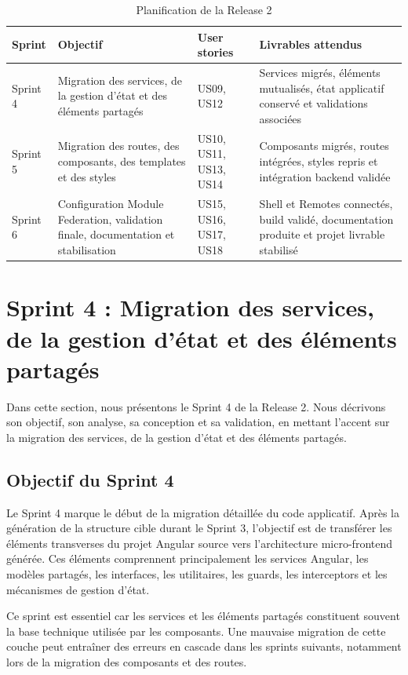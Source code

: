 \begingroup
\renewcommand{\arraystretch}{1.12}
\setlength{\tabcolsep}{4pt}
\begin{longtable}{|p{1.8cm}|p{3.8cm}|p{2.7cm}|p{4.25cm}|}
\caption{Planification de la Release 2}\label{tab:planning-release2}\\
\hline
\textbf{Sprint} & \textbf{Objectif} & \textbf{User stories} & \textbf{Livrables attendus} \\
\hline
Sprint 4 & Migration des services, de la gestion d'état et des éléments partagés & US09, US12 & Services migrés, éléments mutualisés, état applicatif conservé et validations associées \\
\hline
Sprint 5 & Migration des routes, des composants, des templates et des styles & US10, US11, US13, US14 & Composants migrés, routes intégrées, styles repris et intégration backend validée \\
\hline
Sprint 6 & Configuration Module Federation, validation finale, documentation et stabilisation & US15, US16, US17, US18 & Shell et Remotes connectés, build validé, documentation produite et projet livrable stabilisé \\
\hline
\end{longtable}
\endgroup

\section{Sprint 4 : Migration des services, de la gestion d'état et des éléments partagés}

Dans cette section, nous présentons le Sprint 4 de la Release 2. Nous décrivons son objectif, son analyse, sa conception et sa validation, en mettant l'accent sur la migration des services, de la gestion d'état et des éléments partagés.

\subsection{Objectif du Sprint 4}

Le Sprint 4 marque le début de la migration détaillée du code applicatif. Après la génération de la structure cible durant le Sprint 3, l'objectif est de transférer les éléments transverses du projet Angular source vers l'architecture micro-frontend générée. Ces éléments comprennent principalement les services Angular, les modèles partagés, les interfaces, les utilitaires, les guards, les interceptors et les mécanismes de gestion d'état.

Ce sprint est essentiel car les services et les éléments partagés constituent souvent la base technique utilisée par les composants. Une mauvaise migration de cette couche peut entraîner des erreurs en cascade dans les sprints suivants, notamment lors de la migration des composants et des routes.

